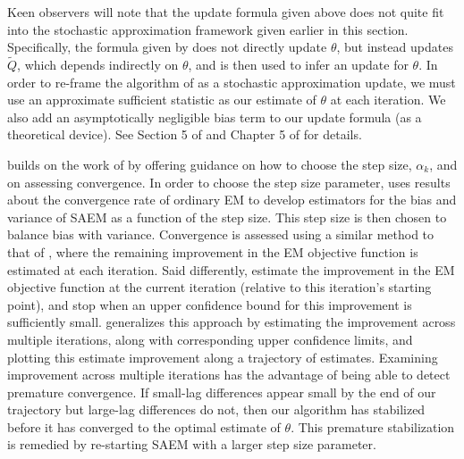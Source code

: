 \documentclass[11pt, oneside]{article}   	%
\begin{document}
Keen observers will note that the update formula given above does not quite fit into the stochastic approximation framework given earlier in this section. Specifically, the formula given by \citet{Dey99} does not directly update $\theta$, but instead updates $\tilde{Q}$, which depends indirectly on $\theta$, and is then used to infer an update for $\theta$. In order to re-frame the algorithm of \citeauthor{Dey99} as a stochastic approximation update, we must use an approximate sufficient statistic as our estimate of $\theta$ at each iteration. We also add an asymptotically negligible bias term to our update formula (as a theoretical device). See Section 5 of \citet{Dey99} and Chapter 5 of \citet{Kus03} for details.

\citet{Jan06} builds on the work of \citet{Dey99} by offering guidance on how to choose the step size, $\alpha_k$, and on assessing convergence. In order to choose the step size parameter, \citeauthor{Jan06} uses results about the convergence rate of ordinary EM to develop estimators for the bias and variance of SAEM as a function of the step size. This step size is then chosen to balance bias with variance. Convergence is assessed using a similar method to that of \citet{Caf05}, where the remaining improvement in the EM objective function is estimated at each iteration. Said differently, \citeauthor{Caf05} estimate the improvement in the EM objective function at the current iteration (relative to this iteration's starting point), and stop when an upper confidence bound for this improvement is sufficiently small. \citeauthor{Jan06} generalizes this approach by estimating the improvement across multiple iterations, along with corresponding upper confidence limits, and plotting this estimate improvement along a trajectory of estimates. Examining improvement across multiple iterations has the advantage of being able to detect premature convergence. If small-lag differences appear small by the end of our trajectory but large-lag differences do not, then our algorithm has stabilized before it has converged to the optimal estimate of $\theta$. This premature stabilization is remedied by re-starting SAEM with a larger step size parameter.
\end{document}
